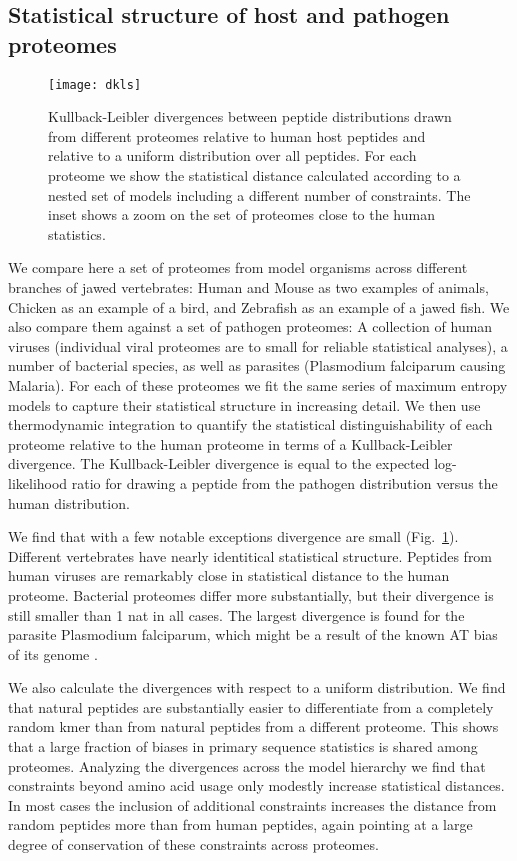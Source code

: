 \documentclass[superscriptaddress,twocolumn,pre]{revtex4}
\newcommand{\<}{\langle}
\renewcommand{\>}{\rangle}
\begin{document}
\subsection{Statistical structure of host and pathogen proteomes}

\begin{figure}
    \texttt{[image: dkls]}
    \caption{Kullback-Leibler divergences between peptide distributions drawn from different proteomes relative to human host peptides and relative to a uniform distribution over all peptides. For each proteome we show the statistical distance calculated according to a nested set of models including a different number of constraints. The inset shows a zoom on the set of proteomes close to the human statistics.
    \label{figdkls}
    }
\end{figure}

We compare here a set of proteomes from model organisms across different branches of jawed vertebrates: Human and Mouse as two examples of animals, Chicken as an example of a bird, and Zebrafish as an example of a jawed fish. We also compare them against a set of pathogen proteomes: A collection of human viruses (individual viral proteomes are to small for reliable statistical analyses), a number of bacterial species, as well as parasites (Plasmodium falciparum causing Malaria). For each of these proteomes we fit the same series of maximum entropy models to capture their statistical structure in increasing detail. We then use thermodynamic integration to quantify the statistical distinguishability of each proteome relative to the human proteome in terms of a Kullback-Leibler divergence. The Kullback-Leibler divergence is equal to the expected log-likelihood ratio for drawing a peptide from the pathogen distribution versus the human distribution. 

We find that with a few notable exceptions divergence are small (Fig.~\ref{figdkls}). Different vertebrates have nearly identitical statistical structure. Peptides from human viruses are remarkably close in statistical distance to the human proteome. Bacterial proteomes differ more substantially, but their divergence is still smaller than 1 nat in all cases. The largest divergence is found for the parasite Plasmodium falciparum, which might be a result of the known AT bias of its genome \cite{Hamilton2017}.

We also calculate the divergences with respect to a uniform distribution. We find that natural peptides are substantially easier to differentiate from a completely random kmer than from natural peptides from a different proteome. This shows that a large fraction of biases in primary sequence statistics is shared among proteomes. Analyzing the divergences across the model hierarchy we find that constraints beyond amino acid usage only modestly increase statistical distances. In most cases the inclusion of additional constraints increases the distance from random peptides more than from human peptides, again pointing at a large degree of conservation of these constraints across proteomes.
\end{document}
